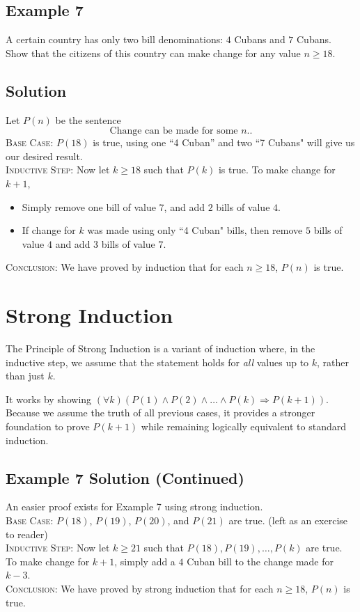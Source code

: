 \documentclass{article}
\begin{document}
\subsection*{Example 7}
    A certain country has only two bill denominations: $4$ Cubans and $7$ Cubans. Show that the citizens of this country can make change for any value $n \ge 18$.

\subsection*{Solution}
    Let $P(n)$ be the sentence $$\text{Change can be made for some $n$.}.$$
    \textsc{Base Case}: $P(18)$ is true, using one ``4 Cuban'' and two ``7 Cubans" will give us our desired result. \\
    \textsc{Inductive Step}: Now let $k \ge 18$ such that $P(k)$ is true. To make change for $k + 1$,
    \begin{itemize}
        \item Simply remove one bill of value $7$, and add $2$ bills of value $4$.
        \item If change for $k$ was made using only ``4 Cuban" bills, then remove $5$ bills of value $4$ and add $3$ bills of value $7$.
    \end{itemize}
    \textsc{Conclusion}: We have proved by induction that for each $n \ge 18$, $P(n)$ is true.

\section*{Strong Induction}
    The Principle of Strong Induction is a variant of induction where, in the inductive step, we assume that the statement holds for \textit{all} values up to $k$, rather than just $k$. 
    
    It works by showing $(\forall k)(P(1) \land P(2) \land \dots \land P(k) \Rightarrow P(k + 1))$. Because we assume the truth of all previous cases, it provides a stronger foundation to prove $P(k + 1)$ while remaining logically equivalent to standard induction.

\subsection*{Example 7 Solution (Continued)}
    An easier proof exists for Example 7 using strong induction. \\
    \textsc{Base Case}: $P(18)$, $P(19)$, $P(20)$, and $P(21)$ are true. (left as an exercise to reader) \\
    \textsc{Inductive Step}: Now let $k \ge 21$ such that $P(18), P(19), \dots, P(k)$ are true. To make change for $k + 1$, simply add a $4$ Cuban bill to the change made for $k - 3$. \\
    \textsc{Conclusion}: We have proved by strong induction that for each $n \ge 18$, $P(n)$ is true.
    
\end{document}

